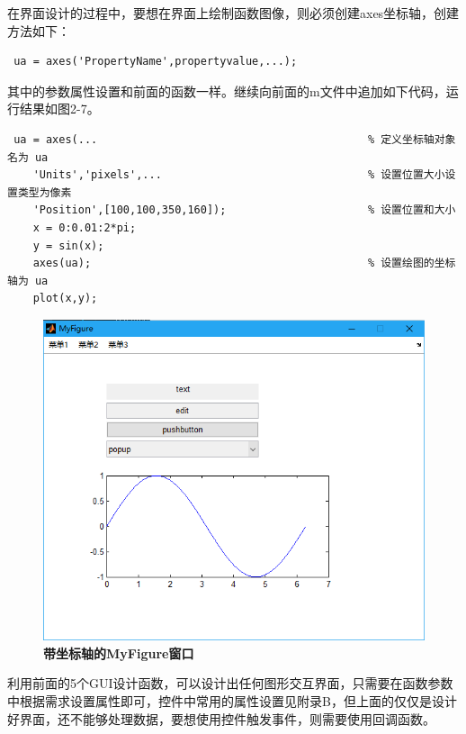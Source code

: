 \begin{enumerate}
	\qquad 在界面设计的过程中，要想在界面上绘制函数图像，则必须创建axes坐标轴，创建方法如下：
	\begin{lstlisting}
 ua = axes('PropertyName',propertyvalue,...);\end{lstlisting}
 	其中的参数属性设置和前面的函数一样。继续向前面的m文件中追加如下代码，运行结果如图2-7。
	 \begin{lstlisting}
 ua = axes(...											% 定义坐标轴对象名为 ua
	'Units','pixels',...								% 设置位置大小设置类型为像素
	'Position',[100,100,350,160]);						% 设置位置和大小
	x = 0:0.01:2*pi;
	y = sin(x);
	axes(ua);											% 设置绘图的坐标轴为 ua
	plot(x,y);\end{lstlisting}
	\begin{figure}[H]
		\centering
		\includegraphics[scale=0.35]{MyFigure_axes}
		\caption{\textbf{带坐标轴的MyFigure窗口}}
	\end{figure}
\end{enumerate}

利用前面的5个GUI设计函数，可以设计出任何图形交互界面，只需要在函数参数中根据需求设置属性即可，控件中常用的属性设置见附录B，但上面的仅仅是设计好界面，还不能够处理数据，要想使用控件触发事件，则需要使用回调函数。
